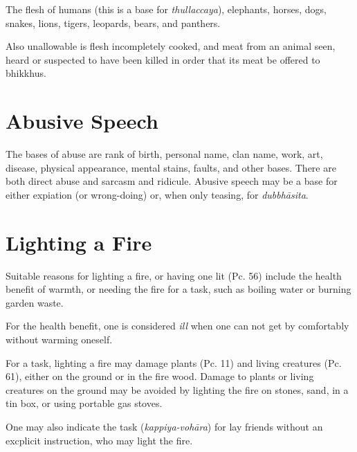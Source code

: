 The flesh of humans (this is a base for \emph{thullaccaya}), elephants, horses,
dogs, snakes, lions, tigers, leopards, bears, and panthers.\\
\mbox{}

Also unallowable is flesh incompletely cooked, and meat from an animal seen,
heard or suspected to have been killed in order that its meat be offered to
bhikkhus.\\
\mbox{}

\section*{Abusive Speech}

The bases of abuse are rank of birth, personal name, clan name, work, art,
disease, physical appearance, mental stains, faults, and other bases. There are
both direct abuse and sarcasm and ridicule. Abusive speech may be a base for
either expiation (or wrong-doing) or, when only teasing, for \emph{dubbhāsita}.


\section*{Lighting a Fire}

Suitable reasons for lighting a fire, or having one lit (Pc. 56) include the
health benefit of warmth, or needing the fire for a task, such as boiling water
or burning garden waste.

For the health benefit, one is considered \emph{ill} when one can not get by
comfortably without warming oneself.

For a task, lighting a fire may damage plants (Pc. 11) and living creatures (Pc.
61), either on the ground or in the fire wood. Damage to plants or living
creatures on the ground may be avoided by lighting the fire on stones, sand, in
a tin box, or using portable gas stoves.

One may also indicate the task (\emph{kappiya-vohāra}) for lay friends without
an excplicit instruction, who may light the fire.

